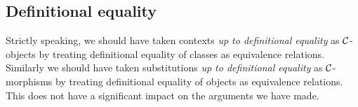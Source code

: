 \subsection{Definitional equality}
Strictly speaking, we should have taken contexts \textit{up to definitional equality}
as $\mathcal{C}$-objects by treating definitional equality of classes as equivalence relations.
Similarly we should have taken substitutions \textit{up to definitional equality}
as $\mathcal{C}$-morphisms by treating definitional equality of objects as equivalence relations.
This does not have a significant impact on the arguments we have made.

